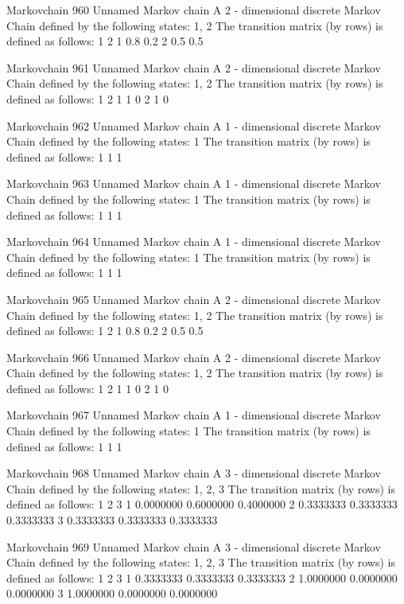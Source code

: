 \documentclass[
  nojss]{jss}
\begin{document}
\begin{CodeChunk}
\begin{CodeOutput}
Markovchain  960 
Unnamed Markov chain 
 A  2 - dimensional discrete Markov Chain defined by the following states: 
 1, 2 
 The transition matrix  (by rows)  is defined as follows: 
    1   2
1 0.8 0.2
2 0.5 0.5

Markovchain  961 
Unnamed Markov chain 
 A  2 - dimensional discrete Markov Chain defined by the following states: 
 1, 2 
 The transition matrix  (by rows)  is defined as follows: 
  1 2
1 1 0
2 1 0

Markovchain  962 
Unnamed Markov chain 
 A  1 - dimensional discrete Markov Chain defined by the following states: 
 1 
 The transition matrix  (by rows)  is defined as follows: 
  1
1 1

Markovchain  963 
Unnamed Markov chain 
 A  1 - dimensional discrete Markov Chain defined by the following states: 
 1 
 The transition matrix  (by rows)  is defined as follows: 
  1
1 1

Markovchain  964 
Unnamed Markov chain 
 A  1 - dimensional discrete Markov Chain defined by the following states: 
 1 
 The transition matrix  (by rows)  is defined as follows: 
  1
1 1

Markovchain  965 
Unnamed Markov chain 
 A  2 - dimensional discrete Markov Chain defined by the following states: 
 1, 2 
 The transition matrix  (by rows)  is defined as follows: 
    1   2
1 0.8 0.2
2 0.5 0.5

Markovchain  966 
Unnamed Markov chain 
 A  2 - dimensional discrete Markov Chain defined by the following states: 
 1, 2 
 The transition matrix  (by rows)  is defined as follows: 
  1 2
1 1 0
2 1 0

Markovchain  967 
Unnamed Markov chain 
 A  1 - dimensional discrete Markov Chain defined by the following states: 
 1 
 The transition matrix  (by rows)  is defined as follows: 
  1
1 1

Markovchain  968 
Unnamed Markov chain 
 A  3 - dimensional discrete Markov Chain defined by the following states: 
 1, 2, 3 
 The transition matrix  (by rows)  is defined as follows: 
          1         2         3
1 0.0000000 0.6000000 0.4000000
2 0.3333333 0.3333333 0.3333333
3 0.3333333 0.3333333 0.3333333

Markovchain  969 
Unnamed Markov chain 
 A  3 - dimensional discrete Markov Chain defined by the following states: 
 1, 2, 3 
 The transition matrix  (by rows)  is defined as follows: 
          1         2         3
1 0.3333333 0.3333333 0.3333333
2 1.0000000 0.0000000 0.0000000
3 1.0000000 0.0000000 0.0000000


\end{CodeOutput}
\end{CodeChunk}
\end{document}
